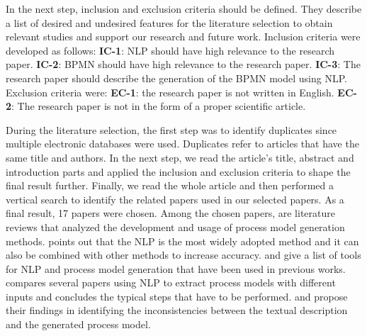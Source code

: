 	In the next step, inclusion and exclusion criteria should be defined. They describe a list of desired and undesired features for the literature selection to obtain relevant studies and support our research and future work. Inclusion criteria were developed as follows: \textbf{IC-1}: NLP should have high relevance to the research paper. \textbf{IC-2}: BPMN should have high relevance to the research paper. \textbf{IC-3}: The research paper should describe the generation of the BPMN model using NLP. Exclusion criteria were: \textbf {EC-1}: the research paper is not written in English. \textbf{EC-2}: The research paper is not in the form of a proper scientific article. 
	
	During the literature selection, the first step was to identify duplicates since multiple electronic databases were used. Duplicates refer to articles that have the same title and authors. In the next step, we read the article's title, abstract and introduction parts and applied the inclusion and exclusion criteria to shape the final result further. Finally, we read the whole article and then performed a vertical search to identify the related papers used in our selected papers. As a final result, 17 papers were chosen. Among the chosen papers, \cite{literature_review_1} \cite{literature_review_2} \cite{literature_review_3} \cite{literature_review_4} are literature reviews that analyzed the development and usage of process model generation methods. \cite{literature_review_3} points out that the NLP is the most widely adopted method and it can also be combined with other methods to increase accuracy. \cite{literature_review_1} and \cite{literature_review_3} give a list of tools for NLP and process model generation that have been used in previous works. \cite{literature_review_4} compares several papers using NLP to extract process models with different inputs and concludes the typical steps that have to be performed. \cite{complement_2} and \cite{complement_3} propose their findings in identifying the inconsistencies between the textual description and the generated process model. 
	
	
